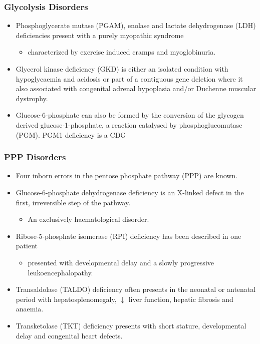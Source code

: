 \documentclass{scrartcl}
\begin{document}
\subsubsection{Glycolysis Disorders}
\label{sec:org8be76b6}
\begin{itemize}
\item Phosphoglycerate mutase (PGAM), enolase and lactate dehydrogenase
(LDH) deficiencies present with a purely myopathic syndrome
\begin{itemize}
\item characterized by exercise induced cramps and myoglobinuria.
\end{itemize}

\item Glycerol kinase deficiency (GKD) is either an isolated condition
with hypoglycaemia and acidosis or part of a contiguous
gene deletion where it also associated with congenital adrenal
hypoplasia and/or Duchenne muscular dystrophy.

\item Glucose-6-phosphate can also be formed by the conversion of the
glycogen derived glucose-1-phosphate, a reaction catalysed by
phosphoglucomutase (PGM). PGM1 deficiency is a CDG
\end{itemize}

\subsubsection{PPP Disorders}
\label{sec:orgb26508b}

\begin{itemize}
\item Four inborn errors in the pentose phosphate pathway (PPP) are known.
\item Glucose-6-phosphate dehydrogenase deficiency is an X-linked defect
in the first, irreversible step of the pathway.
\begin{itemize}
\item An exclusively haematological disorder.
\end{itemize}
\item Ribose-5-phosphate isomerase (RPI) deficiency has been described in one patient
\begin{itemize}
\item presented with developmental delay and a slowly progressive leukoencephalopathy.
\end{itemize}
\item Transaldolase (TALDO) deficiency often presents in the neonatal or
antenatal period with hepatosplenomegaly, \(\downarrow\) liver function,
hepatic fibrosis and anaemia.
\item Transketolase (TKT) deficiency presents with short stature,
developmental delay and congenital heart defects.
\end{itemize}
\end{document}
